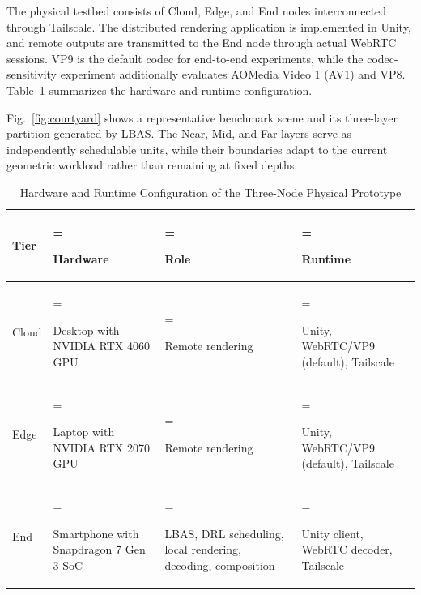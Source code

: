 \documentclass[10pt,journal,compsoc]{IEEEtran}
\begin{document}
The physical testbed consists of Cloud, Edge, and End nodes interconnected through Tailscale. The distributed rendering application is implemented in Unity, and remote outputs are transmitted to the End node through actual WebRTC sessions. VP9 is the default codec for end-to-end experiments, while the codec-sensitivity experiment additionally evaluates AOMedia Video 1 (AV1) and VP8. Table~\ref{tab:prototype_config} summarizes the hardware and runtime configuration.

Fig.~\ref{fig:courtyard} shows a representative benchmark scene and its three-layer partition generated by LBAS. The Near, Mid, and Far layers serve as independently schedulable units, while their boundaries adapt to the current geometric workload rather than remaining at fixed depths.

\begin{table}[t]
	\centering
	\caption{Hardware and Runtime Configuration of the Three-Node Physical Prototype}
	\label{tab:prototype_config}
	\footnotesize
	\setlength{\tabcolsep}{6pt}
	\renewcommand{\arraystretch}{1.05}
	\begin{tabularx}{\textwidth}{@{}l
		>{\hsize=1.1\hsize\linewidth=\hsize\raggedright\arraybackslash}X
		>{\hsize=1.0\hsize\linewidth=\hsize\raggedright\arraybackslash}X
		>{\hsize=0.9\hsize\linewidth=\hsize\raggedright\arraybackslash}X@{}}
			\toprule
			\textbf{Tier} & \textbf{Hardware} & \textbf{Role} & \textbf{Runtime} \\
			\midrule
			Cloud &
			Desktop with NVIDIA RTX 4060 GPU &
			Remote rendering &
			Unity, WebRTC/VP9 (default), Tailscale \\
			Edge &
			Laptop with NVIDIA RTX 2070 GPU &
			Remote rendering &
			Unity, WebRTC/VP9 (default), Tailscale \\
			End &
			Smartphone with Snapdragon 7 Gen 3 SoC &
			LBAS, DRL scheduling, local rendering, decoding, composition &
			Unity client, WebRTC decoder, Tailscale \\
			\bottomrule
	\end{tabularx}
\end{table}
\end{document}
